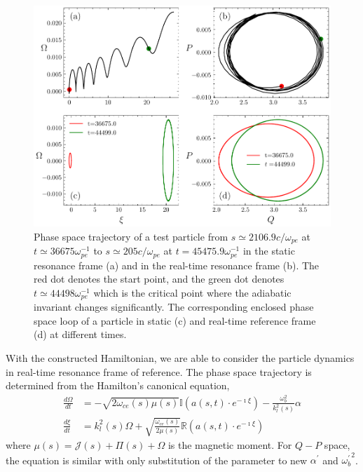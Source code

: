 \begin{figure}
    \centering
    \includegraphics[scale=0.5]{img/Trajectory.pdf}
    \caption{Phase space trajectory of a test particle from $s \simeq 2106.9 c/\omega_{pe}$ at $t\simeq 36675 \omega_{pe}^{-1}$ to $s \simeq 205 c/\omega_{pe}$ at $t=45475.9 \omega_{pe}^{-1}$  in the static resonance frame (a) and  in the real-time resonance frame (b). The red dot denotes the start point, and the green dot denotes $t \simeq 44498  \omega_{pe}^{-1}$ which is the critical point where the adiabatic invariant changes significantly. The corresponding enclosed phase space loop of a particle in static (c) and real-time reference frame (d) at different times.
    \label{fig.traj}
    }
\end{figure}
With the constructed Hamiltonian, we are able to consider the particle dynamics in real-time resonance frame of reference.
The phase space trajectory is determined from the Hamilton's canonical equation,
\begin{equation}
    \begin{aligned}
        \frac{d\Omega}{dt} &= - \sqrt{2\omega_{ce}(s)\mu(s)} \mathbb{I} (a(s,t)\cdot e^{-\imath \xi}) - \frac{\omega^2_{b}}{k_l^2(s)} \alpha
        \\
        \frac{d\xi}{dt} &= k_l^2(s) \Omega +\sqrt{\frac{\omega_{ce}(s)}{2\mu(s)}} \mathbb{R}(a(s,t)\cdot e^{-\imath \xi})
    \end{aligned}
\end{equation}
where $\mu(s) = \mathcal{J}(s)+\Pi(s)+\Omega$ is the magnetic moment.
For $Q-P$ space, the equation is similar with only substitution of the parameter to new $\alpha^\prime$ and ${\omega^\prime_{b}}^2$.

